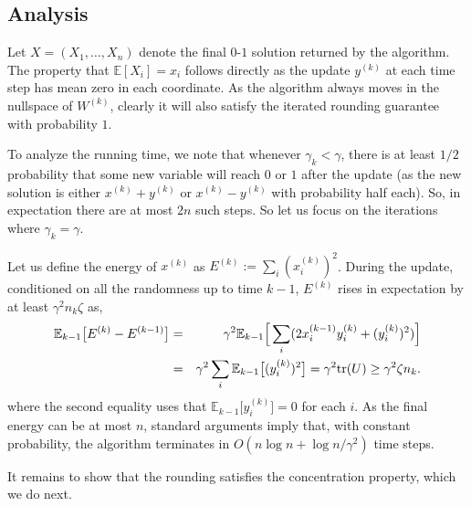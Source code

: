 \documentclass{toc}
\newcommand{\E}{\mathbb{E}}
\begin{document}
\subsection{Analysis}
Let $X = (X_1,\ldots,X_n)$ denote the final $0$-$1$ solution returned by the algorithm. The property that $\E[X_i]=x_i$ follows directly as the update $y^{(k)}$ at each time step has mean zero in each coordinate.
As the algorithm always moves in the nullspace of $W^{(k)}$, clearly it will also satisfy the
iterated rounding guarantee  with probability $1$.

To analyze the running time, we note that whenever $\gamma_k < \gamma$, there is at least $1/2$ probability that some new variable will reach $0$ or $1$ after the update (as the new solution is either $x^{(k)} + y^{(k)}$ or $x^{(k)} - y^{(k)}$ with probability half each). So, in expectation there are at most $2n$ such steps. So let us focus on the iterations where $\gamma_k =\gamma$.

Let us define the energy of $x^{(k)}$ as  $E^{(k)} := \sum_i (x_i^{(k)})^2$. During the update, conditioned on all the randomness up to time $k-1$,
 $E^{(k)}$ rises in expectation by at least $\gamma^2 n_k \zeta$ as,
\begin{eqnarray*}
\E_{k-1}\big[E^{(k)}  - E^{(k-1)}\big]  & =  & \gamma^2 \E_{k-1} \Big{[} \sum_i (2 x_i^{(k-1)} y_i^{(k)} + (y_i^{(k)})^2) \Big{]} \\
& = &
 \gamma^2 \sum_i \E_{k-1}\big[(y_i^{(k)})^2\big] =  \gamma^2 \text{tr}(U) \geq \gamma^2 \zeta n_k. %
\end{eqnarray*}
where the second equality uses that $\E_{k-1}\big[y_i^{(k)}\big] =0$ for each $i$.
%
As the final energy can be at most $n$,
standard arguments \cite{B10, LM12} imply that,  with constant probability, the algorithm terminates in $O(n \log n + \log n/\gamma^2 )$ time steps.

%
%
%
%

It remains to show that the rounding satisfies the concentration property, which we do next.
\end{document}
